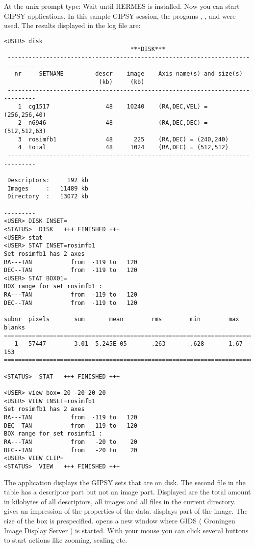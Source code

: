 At the unix prompt type: 
Wait until HERMES is installed. Now you can start GIPSY applications.
In this sample GIPSY session, the progams , , 
and  were used. The results displayed in the log file are: 

\begin{verbatim}   
<USER> disk
                                    ***DISK***
 ------------------------------------------------------------------------------
   nr     SETNAME         descr    image    Axis name(s) and size(s)
                           (kb)     (kb)     
 ------------------------------------------------------------------------------
    1  cg1517                48    10240    (RA,DEC,VEL) = (256,256,40)
    2  n6946                 48             (RA,DEC,DEC) = (512,512,63)
    3  rosimfb1              48      225    (RA,DEC) = (240,240)
    4  total                 48     1024    (RA,DEC) = (512,512)
 ------------------------------------------------------------------------------
   
 Descriptors:     192 kb
 Images     :   11489 kb
 Directory  :   13072 kb
 ------------------------------------------------------------------------------
<USER> DISK INSET=
<STATUS>  DISK   +++ FINISHED +++
<USER> stat
<USER> STAT INSET=rosimfb1
Set rosimfb1 has 2 axes
RA---TAN           from  -119 to   120
DEC--TAN           from  -119 to   120
<USER> STAT BOX01=
BOX range for set rosimfb1 :
RA---TAN           from  -119 to   120
DEC--TAN           from  -119 to   120

subnr  pixels       sum       mean        rms        min        max    blanks
=============================================================================
   1   57447        3.01  5.245E-05       .263      -.628       1.67     153 
=============================================================================
  
<STATUS>  STAT   +++ FINISHED +++

<USER> view box=-20 -20 20 20
<USER> VIEW INSET=rosimfb1
Set rosimfb1 has 2 axes
RA---TAN           from  -119 to   120
DEC--TAN           from  -119 to   120
BOX range for set rosimfb1 :
RA---TAN           from   -20 to    20
DEC--TAN           from   -20 to    20
<USER> VIEW CLIP=
<STATUS>  VIEW   +++ FINISHED +++
\end{verbatim}


The application  displays the GIPSY sets that are on disk.
The second file in the table has a descriptor part but not an image part. 
Displayed are the total amount in kilobytes of all descriptors, all images and all
files in the current directory.  gives an impression
of the properties of the data.  displays part of the image.
The size of the box is prespecified.  opens a new window
where GIDS ( Groningen Image Display Server ) is started. With your
mouse you can click several buttons to start actions like zooming, scaling  etc.


